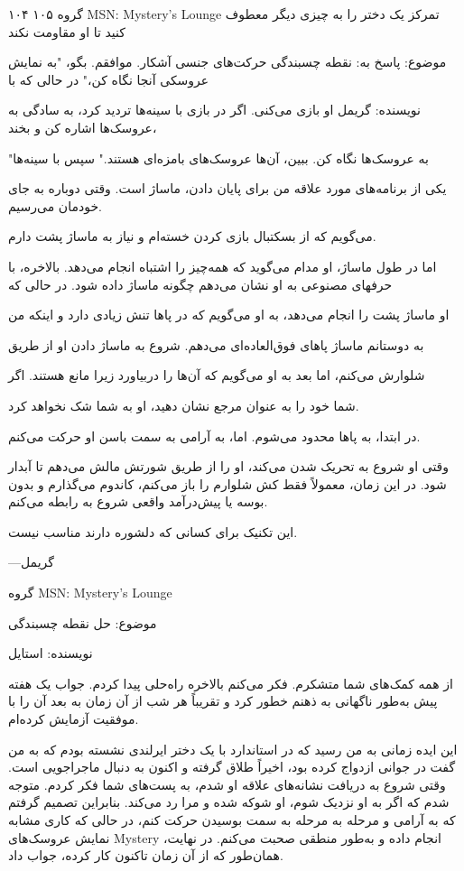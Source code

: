 ۱۰۴ ۱۰۵  
گروه MSN: Mystery's Lounge تمرکز یک دختر را به چیزی دیگر معطوف کنید تا او مقاومت نکند

موضوع: پاسخ به: نقطه چسبندگی حرکت‌های جنسی آشکار. موافقم. بگو، "به نمایش عروسکی آنجا نگاه کن،" در حالی که با

نویسنده: گریمل او بازی می‌کنی. اگر در بازی با سینه‌ها تردید کرد، به سادگی به عروسک‌ها اشاره کن و بخند،

"به عروسک‌ها نگاه کن. ببین، آن‌ها عروسک‌های بامزه‌ای هستند." سپس با سینه‌ها

یکی از برنامه‌های مورد علاقه من برای پایان دادن، ماساژ است. وقتی دوباره به جای خودمان می‌رسیم.

می‌گویم که از بسکتبال بازی کردن خسته‌ام و نیاز به ماساژ پشت دارم.

اما در طول ماساژ، او مدام می‌گوید که همه‌چیز را اشتباه انجام می‌دهد. بالاخره، با حرفهای مصنوعی به او نشان می‌دهم چگونه ماساژ داده شود. در حالی که

او ماساژ پشت را انجام می‌دهد، به او می‌گویم که در پاها تنش زیادی دارد و اینکه من

به دوستانم ماساژ پاهای فوق‌العاده‌ای می‌دهم. شروع به ماساژ دادن او از طریق

شلوارش می‌کنم، اما بعد به او می‌گویم که آن‌ها را دربیاورد زیرا مانع هستند. اگر

شما خود را به عنوان مرجع نشان دهید، او به شما شک نخواهد کرد.

در ابتدا، به پاها محدود می‌شوم. اما، به آرامی به سمت باسن او حرکت می‌کنم.

وقتی او شروع به تحریک شدن می‌کند، او را از طریق شورتش مالش می‌دهم تا آبدار شود. در این زمان، معمولاً فقط کش شلوارم را باز می‌کنم، کاندوم می‌گذارم و بدون بوسه یا پیش‌درآمد واقعی شروع به رابطه می‌کنم.

این تکنیک برای کسانی که دلشوره دارند مناسب نیست.

—گریمل

گروه MSN: Mystery's Lounge  

موضوع: حل نقطه چسبندگی 

نویسنده: استایل  

از همه کمک‌های شما متشکرم. فکر می‌کنم بالاخره راه‌حلی پیدا کردم. جواب یک هفته پیش به‌طور ناگهانی به ذهنم خطور کرد و تقریباً هر شب از آن زمان به بعد آن را با موفقیت آزمایش کرده‌ام.

این ایده زمانی به من رسید که در استاندارد با یک دختر ایرلندی نشسته بودم که به من گفت در جوانی ازدواج کرده بود، اخیراً طلاق گرفته و اکنون به دنبال ماجراجویی است. وقتی شروع به دریافت نشانه‌های علاقه او شدم، به پست‌های شما فکر کردم. متوجه شدم که اگر به او نزدیک شوم، او شوکه شده و مرا رد می‌کند. بنابراین تصمیم گرفتم که به آرامی و مرحله به مرحله به سمت بوسیدن حرکت کنم، در حالی که کاری مشابه نمایش عروسک‌های Mystery انجام داده و به‌طور منطقی صحبت می‌کنم. در نهایت، همان‌طور که از آن زمان تاکنون کار کرده، جواب داد.

